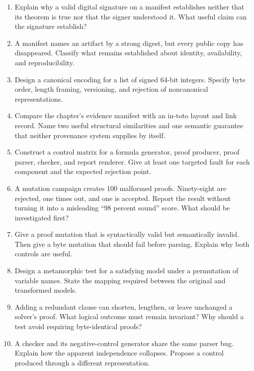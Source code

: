 \begin{enumerate}
\item Explain why a valid digital signature on a manifest establishes neither
that its theorem is true nor that the signer understood it. What useful claim
can the signature establish?

\item A manifest names an artifact by a strong digest, but every public copy
has disappeared. Classify what remains established about identity,
availability, and reproducibility.

\item Design a canonical encoding for a list of signed 64-bit integers.
Specify byte order, length framing, versioning, and rejection of noncanonical
representations.

\item Compare the chapter's evidence manifest with an in-toto layout and link
record. Name two useful structural similarities and one semantic guarantee
that neither provenance system supplies by itself.

\item Construct a control matrix for a formula generator, proof producer,
proof parser, checker, and report renderer. Give at least one targeted fault
for each component and the expected rejection point.

\item A mutation campaign creates 100 malformed proofs. Ninety-eight are
rejected, one times out, and one is accepted. Report the result without
turning it into a misleading ``98 percent sound'' score. What should be
investigated first?

\item Give a proof mutation that is syntactically valid but semantically
invalid. Then give a byte mutation that should fail before parsing. Explain
why both controls are useful.

\item Design a metamorphic test for a satisfying model under a permutation of
variable names. State the mapping required between the original and transformed
models.

\item Adding a redundant clause can shorten, lengthen, or leave unchanged a
solver's proof. What logical outcome must remain invariant? Why should a test
avoid requiring byte-identical proofs?

\item A checker and its negative-control generator share the same parser bug.
Explain how the apparent independence collapses. Propose a control produced
through a different representation.


\end{enumerate}

